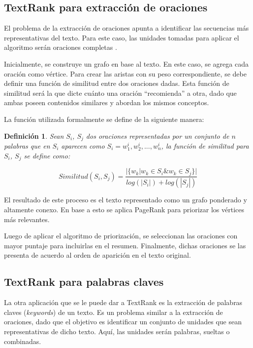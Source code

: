 \documentclass[a4paper]{article}
\newtheorem{definicion}{Definición}
\begin{document}
\subsection{TextRank para extracción de oraciones}
El problema de la extracción de oraciones apunta a identificar las secuencias más representativas del texto. Para este caso, las unidades tomadas para aplicar el algoritmo serán oraciones completas \cite{introductionir}.

Inicialmente, se construye un grafo en base al texto. En este caso, se agrega cada oración como vértice. Para crear las aristas con su peso correspondiente, se debe definir una función de similitud entre dos oraciones dadas. Esta función de similitud será la que dicte cuánto una oración “recomienda” a otra, dado que ambas poseen contenidos similares y abordan los mismos conceptos.
    
La función utilizada formalmente se define de la siguiente manera:

\begin{definicion}
Sean $S_i$, $S_j$ dos oraciones representadas por un conjunto de $n$ palabras que en 
$S_i$ aparecen como $S_i = w_{1}^{i}, w_{2}^{i},..., w_{n}^{i}$, la función de similitud para $S_i$, $S_j$ se define como:

\begin{equation}
Similitud(S_{i},S_{j}) = \frac{ | \{   w_{k} | w_{k} \in S_{i} \& w_{k} \in S_{j}   \}  | }    
                              {  log(|S_{i}|) + log(|S_{j}|)  }
\end{equation}
\end{definicion}
    
El resultado de este proceso es el texto representado como un grafo ponderado y altamente conexo. En base a esto se aplica PageRank para priorizar los vértices más relevantes.

Luego de aplicar el algoritmo de priorización, se seleccionan las oraciones con mayor puntaje para incluirlas en el resumen. Finalmente, dichas oraciones se las presenta de acuerdo al orden de aparición en el texto original.


\subsection{TextRank para palabras claves}
La otra aplicación que se le puede dar a TextRank es la extracción de palabras claves (\textit{keywords}) de un texto. Es un problema similar a la extracción de oraciones, dado que el objetivo es identificar un conjunto de unidades que sean representativas de dicho texto. Aquí, las unidades serán palabras, sueltas o combinadas.
\end{document}
